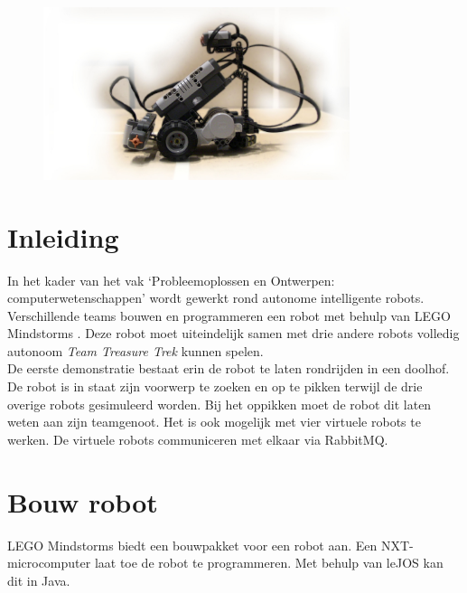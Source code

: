 \documentclass[tt1]{penoverslag}
\begin{document}
\begin{figure}[!hb]
\begin{flushright}
    \includegraphics[width=0.8\textwidth]{robotFP2}
    \label{fig:robotFP2}
\end{flushright}
\end{figure}

\newpage
\setcounter{tocdepth}{2}
\tableofcontents

\newpage


\section{Inleiding} %
\label{ssec:inl}
In het kader van het vak `Probleemoplossen en Ontwerpen: computerwetenschappen' wordt gewerkt rond autonome intelligente robots. Verschillende teams bouwen en programmeren een robot met behulp van LEGO Mindstorms \cite{mindstorms}. Deze robot moet uiteindelijk samen met drie andere robots volledig autonoom \textit{Team Treasure Trek} kunnen spelen.\\

De eerste demonstratie bestaat erin de robot te laten rondrijden in een doolhof. De robot is in staat zijn voorwerp te zoeken en op te pikken terwijl de drie overige robots gesimuleerd worden. Bij het oppikken moet de robot dit laten weten aan zijn teamgenoot. Het is ook mogelijk met vier virtuele robots te werken. De virtuele robots communiceren met elkaar via RabbitMQ.\\


\section{Bouw robot}
\label{ssec:bouwrob}
LEGO Mindstorms \cite{mindstorms} biedt een bouwpakket voor een robot aan. Een NXT-microcomputer laat toe de robot te programmeren. Met behulp van leJOS \cite{leJOS} kan dit in Java.
\end{document}
